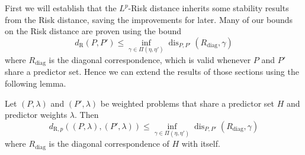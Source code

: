 \documentclass[twoside,11pt]{article}
\newcommand{\dexp}[1][]{d_{\mathrm{R}#1}}
\DeclareMathOperator{\dis}{dis}
\begin{document}
First we will establish that the $L^p$-Risk distance inherits some stability results from the Risk distance, saving the improvements for later.
Many of our bounds on the Risk distance are proven using the bound
\begin{equation}
\dexp(P,P')\leq \inf_{\gamma \in \Pi(\eta,\eta')} \dis_{P,P'}(R_{\mathrm{diag}}, \gamma)\label{ineq:diagonal_bound}
\end{equation}
where $R_{\mathrm{diag}}$ is the diagonal correspondence, which is valid whenever $P$ and $P'$ share a predictor set.
Hence we can extend the results of those sections using the following lemma.
\begin{lemma}\label{lem:p-distance-stability}
    Let $(P,\lambda)$ and $(P',\lambda)$ be weighted problems that share a predictor set $H$ and predictor weights $\lambda$. Then
    \[\dexp[,p]((P,\lambda),(P',\lambda))
    \leq \inf_{\gamma\in \Pi(\eta,\eta')}\dis_{P,P'}(R_{\mathrm{diag}}, \gamma)\]
    where $R_{\mathrm{diag}}$ is the diagonal correspondence of $H$ with itself. 
    \end{lemma}
   
\end{document}
